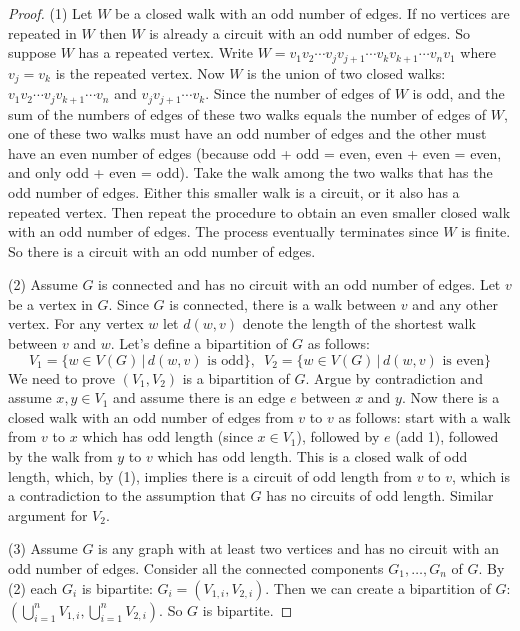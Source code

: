 \documentclass[14pt]{extarticle}
\begin{document}
\begin{proof}
(1) Let \(W\) be a closed walk with an odd number of edges. If no vertices are repeated in \(W\) then \(W\) is already a 
circuit with an odd number of edges. So suppose \(W\) has a repeated vertex. Write \(W = v_1v_2 \cdots v_jv_{j+1} \cdots 
v_kv_{k+1} \cdots v_nv_1\) where \(v_j = v_k\) is the repeated vertex. Now \(W\) is the union of two closed walks: \(v_1v_2 
\cdots v_jv_{k+1} \cdots v_n\) and \(v_jv_{j+1} \cdots v_k\). Since the number of edges of \(W\) is odd, and the sum of the 
numbers of edges of these two walks equals the number of edges of \(W\), one of these two walks must have an odd number of 
edges and the other must have an even number of edges (because odd + odd = even, even + even = even, and only odd + even = 
odd). Take the walk among the two walks that has the odd number of edges. Either this smaller walk is a circuit, or it 
also has a repeated vertex. Then repeat the procedure to obtain an even smaller closed walk with an odd number of 
edges. The process eventually terminates since \(W\) is finite. So there is a circuit with an odd number of edges.

(2) Assume \(G\) is connected and has no circuit with an odd number of edges. Let \(v\) be a vertex in \(G\). Since \(G\)
is connected, there is a walk between \(v\) and any other vertex. For any vertex \(w\) let \(d(w, v)\) denote the length 
of the shortest walk between \(v\) and \(w\). Let's define a bipartition of \(G\) as follows: 
\[
V_1 = \{w \in V(G) \, | \, d(w, v) \text{ is odd}\}, \,\,\, V_2 = \{w \in V(G) \, | \, d(w, v) \text{ is even}\}
\]
We need to prove \((V_1, V_2)\) is a bipartition of \(G\). Argue by contradiction and assume \(x,y \in V_1\) and assume
there is an edge \(e\) between \(x\) and \(y\). Now there is a closed walk with an odd number of edges from \(v\) to \(v\) as 
follows: start with a walk from \(v\) to \(x\) which has odd length (since \(x \in V_1\)), followed by \(e\) (add 1), 
followed by the walk from \(y\) to \(v\) which has odd length. This is a closed walk of odd length, which, by (1), implies
there is a circuit of odd length from \(v\) to \(v\), which is a contradiction to the assumption that \(G\) has no circuits
of odd length. Similar argument for \(V_2\).

(3) Assume \(G\) is any graph with at least two vertices and has no circuit with an odd number of edges. Consider all the
connected components \(G_1, \ldots, G_n\) of \(G\). By (2) each \(G_i\) is bipartite: \(G_i = (V_{1,i}, V_{2,i})\). Then 
we can create a bipartition of \(G\): \((\bigcup_{i=1}^n V_{1,i}, \bigcup_{i=1}^n V_{2,i})\). So \(G\) is bipartite.
\end{proof}
\end{document}
